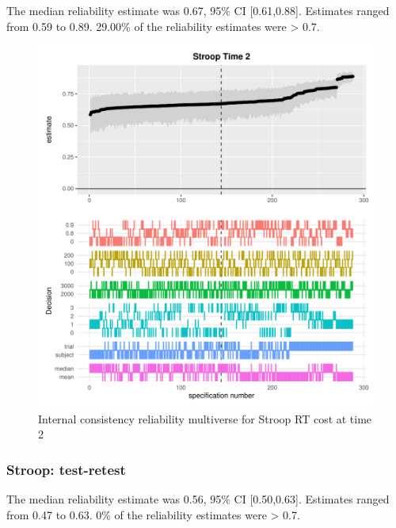 \documentclass[
  english,
  man,floatsintext]{apa6}
\begin{document}
The median reliability estimate was 0.67, 95\% CI {[}0.61,0.88{]}. Estimates ranged from 0.59 to 0.89. 29.00\% of the reliability estimates were \textgreater{} 0.7.

\begin{figure}
\centering
\includegraphics{Reliability_Multiverse_files/figure-latex/unnamed-chunk-6-1.pdf}
\caption{\label{fig:unnamed-chunk-6}Internal consistency reliability multiverse for Stroop RT cost at time 2}
\end{figure}

\newpage

\hypertarget{stroop-test-retest}{%
\subsubsection{Stroop: test-retest}\label{stroop-test-retest}}

The median reliability estimate was 0.56, 95\% CI {[}0.50,0.63{]}. Estimates ranged from 0.47 to 0.63. 0\% of the reliability estimates were \textgreater{} 0.7.
\end{document}
